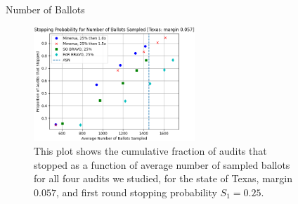 \documentclass[final]{beamer}
\newlength{\sepwidth}
\newlength{\colwidth}
\newcommand{\separatorcolumn}{\begin{column}{\sepwidth}\end{column}}
\begin{document}
\begin{frame}[t]
\begin{columns}[t]
\begin{column}{\colwidth}
%    
%
\end{column}

\separatorcolumn

\begin{column}{\colwidth}


\begin{block}{Number of Ballots}

\begin{figure}
\begin{centering}
\includegraphics[width=0.6\textwidth]{texas25.png}
\caption{This plot shows the cumulative fraction of audits that stopped as a function of average number of sampled ballots for all four audits we studied, for the state of Texas, margin $0.057$, and first round stopping probability $S_1=0.25$.}
\label{fig:texas_25}
\end{centering}
\end{figure}



\end{block}
\end{column}
\end{columns}
\end{frame}
\end{document}
